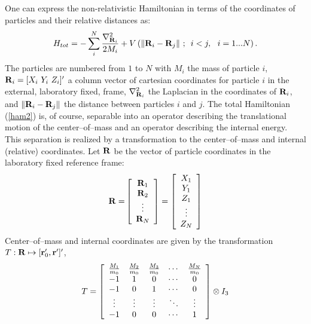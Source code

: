 One can express the non-relativistic Hamiltonian
in terms of the coordinates of particles and
their relative distances as: 
\begin{equation}
H_{tot}=-\sum_i^N\frac{\nabla _{{\bf R}_i}^2}{2M_i}+V\left( \left\| 
{\bf R}_i-{\bf R}_j\right\| \,;\,\,\,i<j,\,\,\,\,i=1...N\right) .
\label{ham2}
\end{equation}
The particles are numbered from $1$ to $N$ with $M_i$ the mass of particle 
$i$, ${\bf R}_i=[X_i\,\,Y_i\,\,Z_i]^{\prime }$ a column vector of cartesian
coordinates for particle $i$ in the external, laboratory fixed, frame, $%
\nabla _{{\bf R}_i}^2$ the Laplacian in the coordinates 
of ${\bf R}_i$, and $\left\| {\bf R}_i-{\bf R}_j\right\| $ 
the distance between
particles $i$ and $j$. The total Hamiltonian (\ref{ham2}) is, of
course, separable into an operator describing the translational motion of
the center--of--mass and an operator describing the internal energy. This
separation is realized by a transformation to 
the center--of--mass and internal
(relative) coordinates.
Let ${\bf R}$ be the vector of particle coordinates in the laboratory
fixed reference frame:
\begin{equation}
{\bf R=}\left[ 
\begin{array}{c}
{\bf R}_1 \\ 
{\bf R}_2 \\ 
\vdots  \\ 
{\bf R}_N
\end{array}
\right] =\left[ 
\begin{array}{c}
X_1 \\ 
Y_1 \\ 
Z_1 \\ 
\vdots  \\ 
Z_N
\end{array}
\right] 
\end{equation}
Center--of--mass and internal coordinates are given by the transformation $T:%
{\bf R}\mapsto [{\bf r}_0^{\prime },{\bf r}^{\prime }]^{\prime }$,
\begin{equation}
T=\left[ 
\begin{array}{ccccc}
\frac{M_1}{m_0} & \frac{M_2}{m_0} & \frac{M_3}{m_0} & \cdots  & \frac{M_N}{%
m_0} \\ 
-1 & 1 & 0 & \cdots  & 0 \\ 
-1 & 0 & 1 & \cdots  & 0 \\ 
\vdots  & \vdots  & \vdots  & \ddots  & \vdots  \\ 
-1 & 0 & 0 & \cdots  & 1
\end{array}
\right] \otimes I_3  \label{Ttran}
\end{equation}
